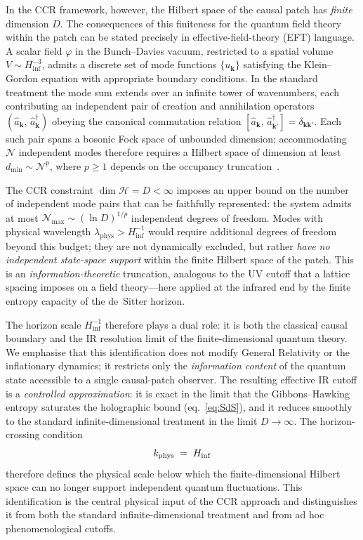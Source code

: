 In the CCR framework, however, the Hilbert space of the causal patch has
\emph{finite} dimension $D$.
%
The consequences of this finiteness for the quantum field theory
within the patch can be stated precisely in effective-field-theory
(EFT) language.
%
A scalar field $\varphi$ in the Bunch--Davies vacuum, restricted to
a spatial volume $V \sim H_{\mathrm{inf}}^{-3}$, admits a discrete
set of mode functions $\{u_{\mathbf{k}}\}$ satisfying the
Klein--Gordon equation with appropriate boundary conditions.
%
In the standard treatment the mode sum extends over an infinite
tower of wavenumbers, each contributing an independent pair of
creation and annihilation operators $(\hat{a}_{\mathbf{k}},\,
\hat{a}_{\mathbf{k}}^\dagger)$ obeying the canonical commutation
relation $[\hat{a}_{\mathbf{k}},\,
\hat{a}_{\mathbf{k}'}^\dagger] = \delta_{\mathbf{k}\mathbf{k}'}$.
Each such pair spans a bosonic Fock space of unbounded dimension;
accommodating $\mathcal{N}$ independent modes therefore requires a
Hilbert space of dimension at least $d_{\min} \sim \mathcal{N}^p$,
where $p \geq 1$ depends on the occupancy truncation~\cite{Bousso:2000}.

The CCR constraint $\dim \mathcal{H} = D < \infty$ imposes an upper
bound on the number of independent mode pairs that can be faithfully
represented: the system admits at most $\mathcal{N}_{\max} \sim
(\ln D)^{1/p}$ independent degrees of freedom.
%
Modes with physical wavelength $\lambda_{\mathrm{phys}} >
H_{\mathrm{inf}}^{-1}$ would require additional degrees of freedom
beyond this budget; they are not dynamically excluded, but rather
\emph{have no independent state-space support} within the finite
Hilbert space of the patch.
%
This is an \emph{information-theoretic} truncation, analogous to the
UV cutoff that a lattice spacing imposes on a field theory---here
applied at the infrared end by the finite entropy capacity of the
de~Sitter horizon.

The horizon scale $H_{\mathrm{inf}}^{-1}$ therefore plays a dual
role: it is both the classical causal boundary and the IR resolution
limit of the finite-dimensional quantum theory.
%
We emphasise that this identification does not modify General
Relativity or the inflationary dynamics; it restricts only the
\emph{information content} of the quantum state accessible to a
single causal-patch observer.
%
The resulting effective IR cutoff is a \emph{controlled
approximation}: it is exact in the limit that the Gibbons--Hawking
entropy saturates the holographic bound (eq.~\eqref{eq:SdS}), and
it reduces smoothly to the standard infinite-dimensional treatment
in the limit $D \to \infty$.
The horizon-crossing condition
%
\begin{equation}
  k_{\rm phys} \;=\; H_{\rm inf}
  \label{eq:horizon_crossing}
\end{equation}
%
therefore defines the physical scale below which the finite-dimensional
Hilbert space can no longer support independent quantum fluctuations.
This identification is the central physical input of the CCR approach and
distinguishes it from both the standard infinite-dimensional treatment and
from ad hoc phenomenological cutoffs.

